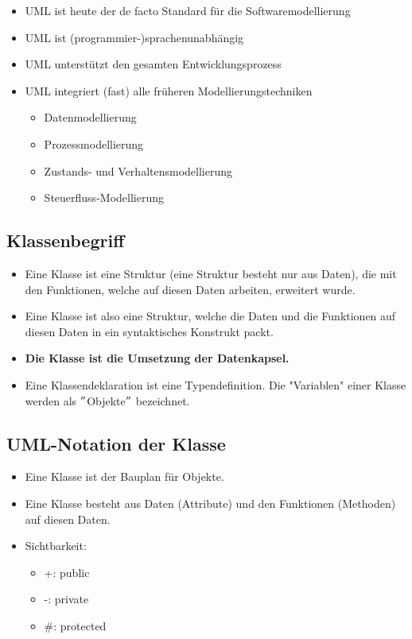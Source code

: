 \begin{multicols}{2}
\begin{itemize}
	\item UML ist heute der de facto Standard für die Softwaremodellierung
	\item UML ist (programmier-)sprachenunabhängig
	\item UML unterstützt den gesamten Entwicklungsprozess
	\item UML integriert (fast) alle früheren Modellierungstechniken
	\begin{itemize}
		\item Datenmodellierung
		\item Prozessmodellierung
		\item Zustands- und Verhaltensmodellierung
		\item Steuerfluss-Modellierung
	\end{itemize}
\end{itemize}
\end{multicols}

\subsection{Klassenbegriff}
\begin{itemize}
	\item Eine Klasse ist eine Struktur (eine Struktur besteht nur aus Daten), die mit den Funktionen, welche auf diesen Daten arbeiten, erweitert wurde.
	\item Eine Klasse ist also eine Struktur, welche die Daten und die Funktionen auf diesen Daten in ein syntaktisches Konstrukt packt.
	\item \textbf{Die Klasse ist die Umsetzung der Datenkapsel.}
	\item Eine Klassendeklaration ist eine Typendefinition. Die "Variablen" einer Klasse werden als $"$Objekte$"$ bezeichnet.
\end{itemize}

\subsection{UML-Notation der Klasse}
\begin{itemize}
	\item Eine Klasse ist der Bauplan für Objekte.
	\item Eine Klasse besteht aus Daten (Attribute) und den Funktionen (Methoden) auf diesen Daten.
	\item Sichtbarkeit:
	\begin{itemize}
		\item[\-] +: public
		\item[\-] -: private
		\item[\-] \#: protected
	\end{itemize}
\end{itemize}

